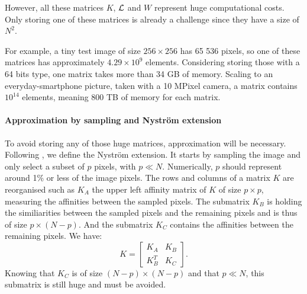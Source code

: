 However, all these matrices \(K\), \(\operatorname{\mathcal{L}}\) and \(W\) represent huge computational costs.
Only storing one of these matrices is already a challenge since they have a size of \(N^2\).

For example, a tiny test image of size \(256 \times 256\) has 65 536 pixels, so one of these matrices has approximately \(4.29 \times 10^9\) elements.
Considering storing those with a 64 bits type, one matrix takes more than 34 GB of memory.
Scaling to an everyday-smartphone picture, taken with a 10 MPixel camera, a matrix contains \(10^{14}\) elements, meaning 800 TB of memory for each matrix.

\paragraph{Approximation by sampling and Nystr\"om extension}

To avoid storing any of those huge matrices, approximation will be necessary.
Following \cite{fowlkes_spectral_2004}, we define the Nystr\"om extension.
It starts by sampling the image and only select a subset of \(p\) pixels, with \(p \ll N\).
Numerically, \(p\) should represent around 1\% or less of the image pixels.
The rows and columns of a matrix \(K\) are reorganised such as \(K_A\) the upper left affinity matrix of \(K\) of size \(p \times p\), measuring the affinities between the sampled pixels.
The submatrix \(K_B\) is holding the similiarities between the sampled pixels and the remaining pixels and is thus of size \(p \times (N-p)\).
And the submatrix \(K_C\) contains the affinities between the remaining pixels.
We have:
\[K = \begin{bmatrix}K_A & K_B \\ K_B^T & K_C\end{bmatrix}.\]
Knowing that \(K_C\) is of size \((N-p) \times (N-p)\) and that \(p \ll N\), this submatrix is still huge and must be avoided.

